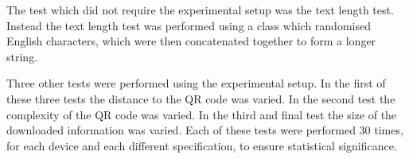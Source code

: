 The test which did not require the experimental setup was the text length test. Instead the text length test was performed using a class which randomised English characters, which were then concatenated together to form a longer string.

Three other tests were performed using the experimental setup. In the first of these three tests the distance to the QR code was varied. In the second test the complexity of the QR code was varied. In the third and final test the size of the downloaded information was varied. Each of these tests were performed 30 times, for each device and each different specification, to ensure statistical significance.